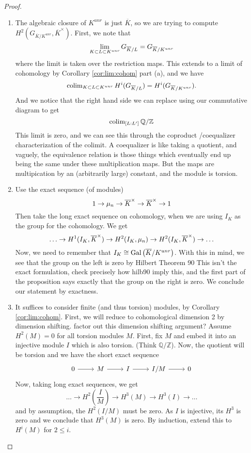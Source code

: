\begin{proof}
	\begin{enumerate}[(1)]
		\item The algebraic closure of \(K^{unr}\) is just \(\overline{K}\),
			so we are trying to compute 
			\(H^{2}(G_{\overline{K} / K^{unr}},\overline{K}^{\times})\).
			First, we note that
			 \[
			 \lim_{K \subset L \subset K^{unr}} G_{\overline{K} / L} 
			 = G_{\overline{K} / K^{unr}}
			 \] 
			where the limit is taken over the restriction maps.
			This extends to a limit of cohomology by 
			Corollary \ref{cor:lim:cohom} part (a), and
			we have
			\[
				\operatorname{colim}_{K \subset L \subset K^{unr}} H^{i}(G_{\overline{K} / L}) 
				= H^{i}(G_{\overline{K} / K^{unr}})
			.\] 
			And we notice that the right hand side we can replace using
			our commutative diagram to get
			\[
				\operatorname{colim}_{[L:L^{\prime}]} \mathbb{Q} / \mathbb{Z}
			\] 
			This limit is zero, and we can see this through the coproduct
			/coequalizer characterization of the colimit. 
			A coequalizer is like taking a quotient, and vaguely, the 
			equivalence relation is those things which eventually end up being
			the same under these multiplication maps. 
			But the maps are multipication by an (arbitrarily large) constant,
			and the module is torsion.
		\item Use the exact sequence (of modules) 
			\[
			1 \to \mu_{n} \to \overline{K}^{\times} \to \overline{K}^{\times}
			\to 1
			\] 
			Then take the long exact sequence on cohomology, when we are using
			\(I_{K}\) as the group for the cohomology.
			We get 
			\[
				\ldots \to H^{1}(I_{K},\overline{K}^{\times}) \to
				H^{2}(I_{K}, \mu_{n}) \to H^{2}(I_{K},\overline{K}^{\times})
				\to \ldots
			\] 
			Now, we need to remember that 
            \(I_{K} \cong \operatorname{Gal}\left( \overline{K} / K^{unr} \right)\).
			With this in mind, we see that
			the group on the left is zero by Hilbert Theorem 90
			{\color{red} This isn't the exact formulation,
			check precisely how hilb90 imply this}, and
			the first part of the proposition
			says exactly that the group on the right is zero. 
			We conclude our statement by exactness.
			
		\item 
			It suffices to consider
			finite (and thus torsion) modules, by Corollary \ref{cor:lim:cohom}.
			First, we will reduce to cohomological dimension 2 by dimension
			shifting. 
			{\color{red} factor out this dimension shifting argument?}
			Assume \(H^{2}(M) = 0\) for all torsion modules \(M\).
			First, fix \(M\) and embed it into an injective module \(I\) 
			which is also torsion.
			(Think \(\mathbb{Q} / \mathbb{Z}\)).
			Now, the quotient will be torsion and we have the short exact sequence
			\[
			\begin{tikzcd}
			0 \arrow{r}{} & M \arrow{r}{} & 
			I \arrow{r}{} & I / M \arrow{r}{} & 0
			\end{tikzcd}
			\]
			Now, taking long exact sequences, we get
			\[
				\ldots \to H^{2}(\frac{I}{M}) \to 
				H^{3}(M) \to H^{3}(I) \to \ldots
			\] 
			and by assumption, the \(H^{2}(I / M)\) must be zero.
			As \(I\) is injective, its \(H^{3}\) is zero and we conclude
			that \(H^{3}(M)\) is zero. 
			By induction, extend this to \(H^{i}(M)\) for \(2 \leq i\).


\end{enumerate}
\end{proof}
